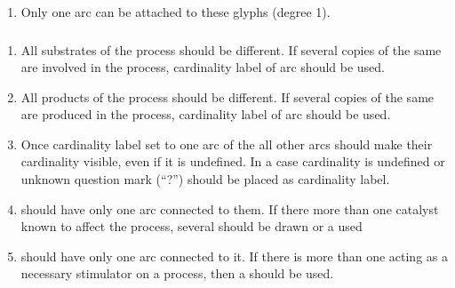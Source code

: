  \begin{enumerate}
    \item Only one arc can be attached to these glyphs (degree 1).
  \end{enumerate}

\subsubsection{}
 \begin{enumerate}
    \item All substrates of the process should be different. If several 
    copies of the same  are involved in the process, cardinality label of 
     arc should be used.
    \item All products of the process should be different. If several copies 
    of the same  are produced in the process, cardinality label of 
     arc should be used.
    \item Once cardinality label set to one arc of the  all other arcs should
    make their cardinality visible, even if it is undefined. In a case
    cardinality is undefined or unknown question mark (``?'') should be placed as cardinality label. 
    \item {} should have only one  arc connected to them. If
    there more than one catalyst known to affect the process, several  should be
    drawn or a  used 
    \item {} should have only one  arc connected to it. If
    there is more than one  acting as a necessary stimulator on a process, then a  should be used.    \end{enumerate}  

\subsubsection{}

